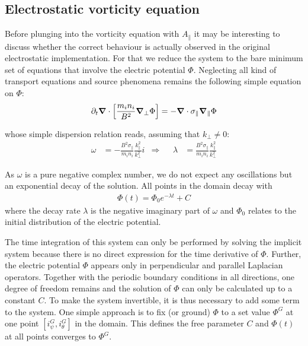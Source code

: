\subsection{Electrostatic vorticity equation}
Before plunging into the vorticity equation with $A_\parallel$ it may be interesting to discuss whether the correct behaviour is actually observed in the original electrostatic implementation. For that we reduce the system to the bare minimum set of equations that involve the electric potential $\Phi$. Neglecting all kind of transport equations and source phenomena remains the following simple equation on $\Phi$: \\
\begin{equation}
		\partial_t\grad\cdot\left[\frac{m_in_i}{B^2}\grad_\perp\Phi\right] = -\grad\cdot\sigma_\parallel\grad_\parallel\Phi \label{eq:AdvectionSLAB_PHI}
\end{equation}

whose simple dispersion relation reads, assuming that $k_\perp \ne 0$:
\begin{align}
	\omega &= -\frac{B^2\sigma_\parallel}{m_in_i}\frac{k_\parallel^2}{k_\perp^2}i &\Rightarrow&& \lambda &= \frac{B^2\sigma_\parallel}{m_in_i}\frac{k_\parallel^2}{k_\perp^2}
\label{eq:AdvectionSLAB_dispersionRelation}
\end{align}

As $\omega$ is a pure negative complex number, we do not expect any oscillations but an exponential decay of the solution. All points in the domain decay with 
\begin{align}
	\Phi(t) = \Phi_0 e^{-\lambda t} + C \label{eq:electrostaticSLABdecay}
\end{align} 
where the decay rate $\lambda$ is the negative imaginary part of $\omega$ and $\Phi_0$ relates to the initial distribution of the electric potential.

The time integration of this system can only be performed by solving the implicit system because there is no direct expression for the time derivative of $\Phi$. Further, the electric potential $\Phi$ appears only in perpendicular and parallel Laplacian operators. Together with the periodic boundary conditions in all directions, one degree of freedom remains and the solution of $\Phi$ can only be calculated up to a constant $C$. To make the system invertible, it is thus necessary to add some term to the system. One simple approach is to fix (or ground) $\Phi$ to a set value $\Phi^G$ at one point $[i_\psi^G, i_\theta^G]$ in the domain. This defines the free parameter $C$ and $\Phi(t)$ at all points converges to $\Phi^G$. 


